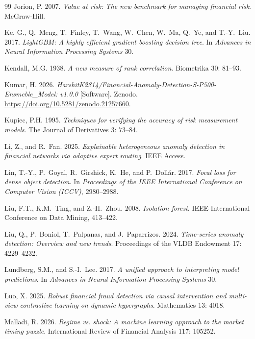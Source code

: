 \documentclass[]{interact}
\begin{document}
\begin{thebibliography}{99}
Jorion, P. 2007. \emph{Value at risk: The new benchmark for managing financial risk}. McGraw-Hill.

Ke, G., Q.~Meng, T.~Finley, T.~Wang, W.~Chen, W.~Ma, Q.~Ye, and T.-Y.~Liu. 2017. \emph{LightGBM: A highly efficient gradient boosting decision tree}. In \emph{Advances in Neural Information Processing Systems} 30.

Kendall, M.G. 1938. \emph{A new measure of rank correlation}. Biometrika 30: 81--93.

Kumar, H. 2026. \emph{HarshitK2814/Financial-Anomaly-Detection-S-P500-Ensmeble\_Model: v1.0.0} [Software]. Zenodo. \url{https://doi.org/10.5281/zenodo.21257660}.

Kupiec, P.H. 1995. \emph{Techniques for verifying the accuracy of risk measurement models}. The Journal of Derivatives 3: 73--84.

Li, Z., and R.~Fan. 2025. \emph{Explainable heterogeneous anomaly detection in financial networks via adaptive expert routing}. IEEE Access.

Lin, T.-Y., P.~Goyal, R.~Girshick, K.~He, and P.~Doll\'{a}r. 2017. \emph{Focal loss for dense object detection}. In \emph{Proceedings of the IEEE International Conference on Computer Vision (ICCV)}, 2980--2988.

Liu, F.T., K.M.~Ting, and Z.-H.~Zhou. 2008. \emph{Isolation forest}. IEEE International Conference on Data Mining, 413--422.

Liu, Q., P.~Boniol, T.~Palpanas, and J.~Paparrizos. 2024. \emph{Time-series anomaly detection: Overview and new trends}. Proceedings of the VLDB Endowment 17: 4229--4232.

Lundberg, S.M., and S.-I.~Lee. 2017. \emph{A unified approach to interpreting model predictions}. In \emph{Advances in Neural Information Processing Systems} 30.

Luo, X. 2025. \emph{Robust financial fraud detection via causal intervention and multi-view contrastive learning on dynamic hypergraphs}. Mathematics 13: 4018.

Malladi, R. 2026. \emph{Regime vs. shock: A machine learning approach to the market timing puzzle}. International Review of Financial Analysis 117: 105252. 


\end{thebibliography}
\end{document}
